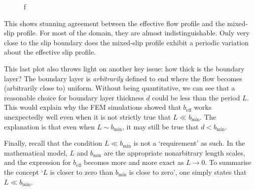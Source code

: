 \documentclass[12pt, a4paper, twoside, openright]{book}
\newcommand{\beff}{\ensuremath{b_{\mathrm{eff}}}}
\newcommand{\bmin}{\ensuremath{b_{\mathrm{min}}}}
\begin{document}
\begin{figure}[ht]
\centering
{}
\caption{f}\label{f}
\end{figure}

This shows stunning agreement between the effective flow profile and the mixed-slip profile.  For most of the domain, they are almost indistinguishable.  Only very close to the slip boundary does the mixed-slip profile exhibit a periodic variation about the effective slip profile.

\vspace{1em}

This last plot also throws light on another key issue: how thick is the boundary layer?  The boundary layer is \emph{arbitrarily} defined to end where the flow becomes (arbitrarily close to) uniform.  Without being quantitative, we can see that a reasonable choice for boundary layer thickness $d$ could be less than the period $L$.  This would explain why the FEM simulations showed that $\beff$ works unexpectedly well even when it is not strictly true that $L \ll \bmin$.  The explanation is that even when $L \sim \bmin$, it may still be true that $d < \bmin$.  

Finally, recall that the condition $L \ll \bmin$ is not a `requirement' as such.  In the mathematical model, $L$ and $\bmin$ are the appropriate nonarbitrary length scales, and the expression for $\beff$ becomes more and more exact as $L \to 0$.  To summarise the concept `$L$ is closer to zero than $\bmin$ is close to zero', one simply states that $L \ll \bmin$.
\end{document}
